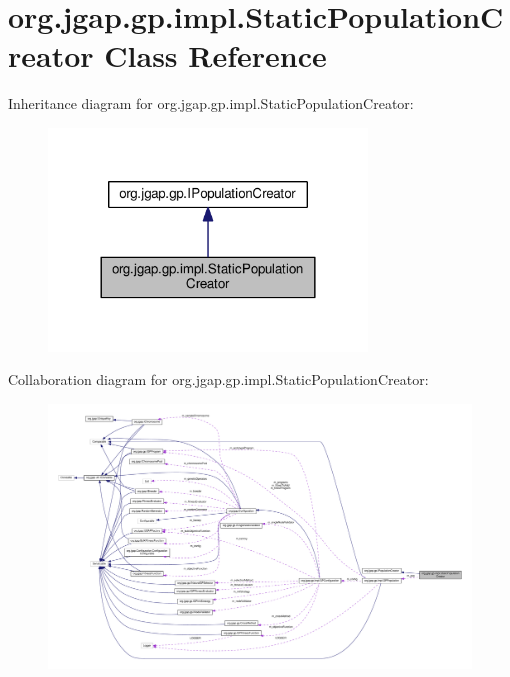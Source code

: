 \hypertarget{classorg_1_1jgap_1_1gp_1_1impl_1_1_static_population_creator}{\section{org.\-jgap.\-gp.\-impl.\-Static\-Population\-Creator Class Reference}
\label{classorg_1_1jgap_1_1gp_1_1impl_1_1_static_population_creator}
}


Inheritance diagram for org.\-jgap.\-gp.\-impl.\-Static\-Population\-Creator\-:
\nopagebreak
\begin{figure}[H]
\begin{center}
\leavevmode
\includegraphics[width=240pt]{classorg_1_1jgap_1_1gp_1_1impl_1_1_static_population_creator__inherit__graph}
\end{center}
\end{figure}


Collaboration diagram for org.\-jgap.\-gp.\-impl.\-Static\-Population\-Creator\-:
\nopagebreak
\begin{figure}[H]
\begin{center}
\leavevmode
\includegraphics[width=350pt]{classorg_1_1jgap_1_1gp_1_1impl_1_1_static_population_creator__coll__graph}
\end{center}
\end{figure}
